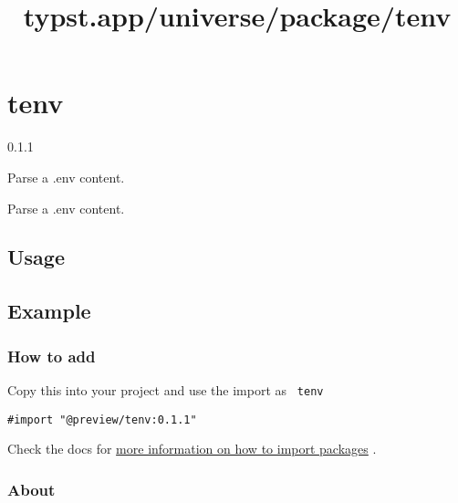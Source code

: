 \title{typst.app/universe/package/tenv}

\label{banner}
\section{tenv}\label{tenv}

{ 0.1.1 }

Parse a .env content.

\label{readme}
Parse a .env content.

\subsection{Usage}\label{usage}

\begin{Shaded}
\begin{Highlighting}[]

\end{Highlighting}
\end{Shaded}

\subsection{Example}\label{example}


\subsubsection{How to add}\label{how-to-add}

Copy this into your project and use the import as \texttt{\ tenv\ }

\begin{verbatim}
#import "@preview/tenv:0.1.1"
\end{verbatim}



Check the docs for
\href{https://typst.app/docs/reference/scripting/\#packages}{more
information on how to import packages} .

\subsubsection{About}\label{about}

